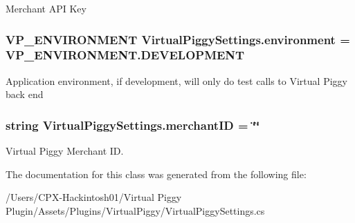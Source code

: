 Merchant A\-P\-I Key 

\hypertarget{class_virtual_piggy_settings_aa1795be8074c0d0ef5abfd13bfbf3007}{
\subsubsection[{environment}]{\setlength{\rightskip}{0pt plus 5cm}V\-P\-\_\-\-E\-N\-V\-I\-R\-O\-N\-M\-E\-N\-T Virtual\-Piggy\-Settings.\-environment = V\-P\-\_\-\-E\-N\-V\-I\-R\-O\-N\-M\-E\-N\-T.\-D\-E\-V\-E\-L\-O\-P\-M\-E\-N\-T\hspace{0.3cm}{\ttfamily [static]}}}\label{class_virtual_piggy_settings_aa1795be8074c0d0ef5abfd13bfbf3007}


Application environment, if development, will only do test calls to Virtual Piggy back end 

\hypertarget{class_virtual_piggy_settings_af24b0af7a500e1e344784a0d209b3fbd}{
\subsubsection[{merchant\-I\-D}]{\setlength{\rightskip}{0pt plus 5cm}string Virtual\-Piggy\-Settings.\-merchant\-I\-D = \char`\"{}\char`\"{}\hspace{0.3cm}{\ttfamily [static]}}}\label{class_virtual_piggy_settings_af24b0af7a500e1e344784a0d209b3fbd}


Virtual Piggy Merchant I\-D. 



The documentation for this class was generated from the following file\-:\begin{DoxyCompactItemize}
\item 
/\-Users/\-C\-P\-X-\/\-Hackintosh01/\-Virtual Piggy Plugin/\-Assets/\-Plugins/\-Virtual\-Piggy/Virtual\-Piggy\-Settings.\-cs\end{DoxyCompactItemize}
